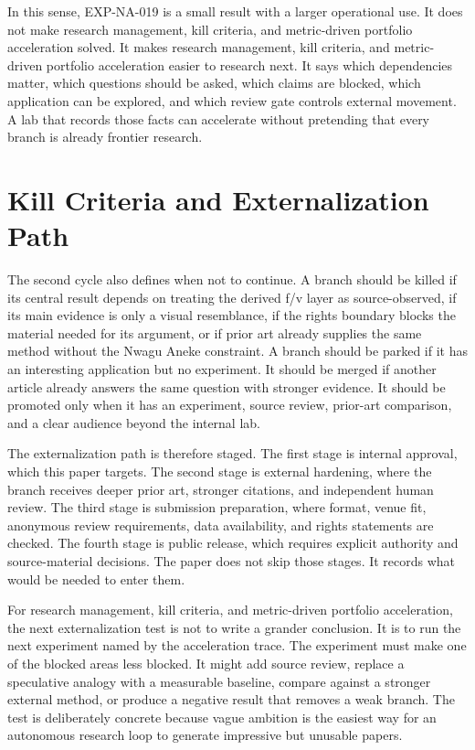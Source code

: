 \documentclass[sigconf,nonacm]{acmart}
\begin{document}
In this sense, EXP-NA-019 is a small result with a larger operational use. It
does not make research management, kill criteria, and metric-driven portfolio acceleration solved. It makes research management, kill criteria, and metric-driven portfolio acceleration easier to research next. It says
which dependencies matter, which questions should be asked, which claims are
blocked, which application can be explored, and which review gate controls
external movement. A lab that records those facts can accelerate without
pretending that every branch is already frontier research.

\section{Kill Criteria and Externalization Path}
The second cycle also defines when not to continue. A branch should be killed if
its central result depends on treating the derived f/v layer as source-observed,
if its main evidence is only a visual resemblance, if the rights boundary blocks
the material needed for its argument, or if prior art already supplies the same
method without the Nwagu Aneke constraint. A branch should be parked if it has
an interesting application but no experiment. It should be merged if another
article already answers the same question with stronger evidence. It should be
promoted only when it has an experiment, source review, prior-art comparison,
and a clear audience beyond the internal lab.

The externalization path is therefore staged. The first stage is internal
approval, which this paper targets. The second stage is external hardening, where
the branch receives deeper prior art, stronger citations, and independent human
review. The third stage is submission preparation, where format, venue fit,
anonymous review requirements, data availability, and rights statements are
checked. The fourth stage is public release, which requires explicit authority
and source-material decisions. The paper does not skip those stages. It records
what would be needed to enter them.

For research management, kill criteria, and metric-driven portfolio acceleration, the next externalization test is not to write a grander conclusion.
It is to run the next experiment named by the acceleration trace. The experiment
must make one of the blocked areas less blocked. It might add source review,
replace a speculative analogy with a measurable baseline, compare against a
stronger external method, or produce a negative result that removes a weak
branch. The test is deliberately concrete because vague ambition is the easiest
way for an autonomous research loop to generate impressive but unusable papers.
\end{document}
